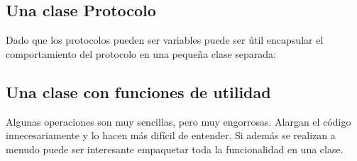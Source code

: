 \documentclass[letterpaper,10pt,spanish]{sphinxmanual}
\begin{document}
\subsection{Una clase Protocolo}
\label{\detokenize{textos/tema3:una-clase-protocolo}}
Dado que los protocolos pueden ser variables puede ser útil encapsular el comportamiento del protocolo en una pequeña clase separada:

%
\begin{sphinxVerbatim}[commandchars=\\\{\}]
   
           
           
                 
                 
           
                 
                 
           
                 
\end{sphinxVerbatim}


\subsection{Una clase con funciones de utilidad}
\label{\detokenize{textos/tema3:una-clase-con-funciones-de-utilidad}}
Algunas operaciones son muy sencillas, pero muy engorrosas. Alargan el código innecesariamente y lo hacen más difícil de entender. Si además se realizan a menudo puede ser interesante empaquetar toda la funcionalidad en una clase.
\end{document}
